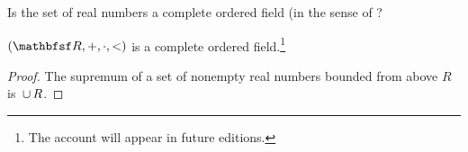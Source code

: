 

Is the set of real numbers a complete ordered field (in the sense of ?


\begin{proposition}
  $(\R, +, \cdot, <)$ is a complete ordered field.\footnote{The account will appear in future editions.}
\end{proposition}
\begin{proof}
  The supremum of a set of nonempty real numbers bounded from above $R$ is $\,\cup\, R$.
\end{proof}

\blankpage
